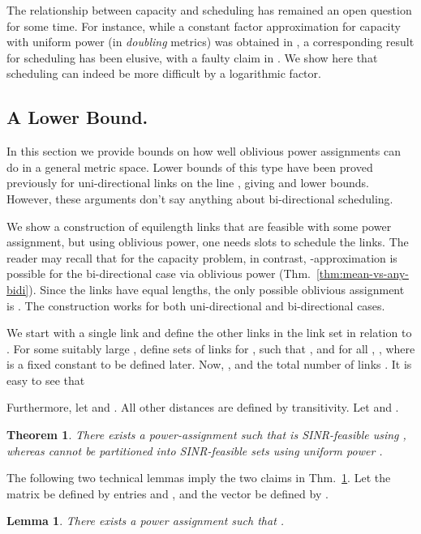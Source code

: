\documentclass[11pt]{amsart}
\newcounter{foo}
\newtheorem{theorem}[foo]{Theorem}
\newtheorem{lemma}[foo]{Lemma}
\begin{document}
The relationship between capacity and scheduling has remained an open
question for some time. For instance, while a constant factor
approximation for capacity with uniform power (in \emph{doubling} metrics) was
obtained in \cite{GHWW09}, a corresponding result for scheduling has
been elusive, with a faulty claim in \cite{HW09}.
We show here that scheduling can indeed be more difficult by a
logarithmic factor. 

\subsection{A Lower Bound.}
In this section we provide bounds on how well oblivious power assignments can do in a general metric space. 
Lower bounds of this type have been proved previously for uni-directional links on the line \cite{FKRV09,us:esa09full},
giving
 and  lower bounds. However, these
arguments don't say anything about bi-directional scheduling.

We  show a construction of equilength links that are feasible with
some power assignment, but  using oblivious power, one needs  slots to schedule the links.
The reader may recall that for the capacity problem, in contrast, -approximation is possible for
the bi-directional case via oblivious power (Thm.~\ref{thm:mean-vs-any-bidi}).
Since the links have equal lengths, the only possible oblivious assignment is .
The construction works for both uni-directional and bi-directional cases.

We start with a single link  and define the other links in the link set  in relation to . For some 
suitably large , define sets  of links 
 for , such that , and for all 
, , where
  is a fixed constant to
be defined later. Now, , and the total number of links . It is easy to see that

Furthermore, let  and .
All other distances are defined by transitivity. Let  and .


\begin{theorem}
\label{th:lb}
There exists a power-assignment  such that  is SINR-feasible
using , whereas  cannot be partitioned into 
SINR-feasible sets using uniform power . 
\end{theorem}

The following two technical lemmas imply the two claims in Thm.~\ref{th:lb}. Let
the  matrix  be defined by entries  and , and the vector
 be defined by .
\begin{lemma}
\label{lbmain1}
There exists a power assignment  such that
.
\end{lemma}
\end{document}
